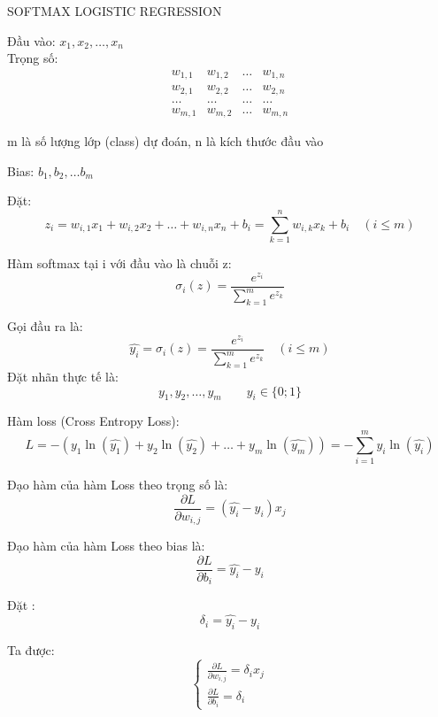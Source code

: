 \documentclass{article}
\begin{document}
\begin{center}
    {\LARGE SOFTMAX LOGISTIC REGRESSION}
\end{center}

\noindent Đầu vào: $x_1, x_2, \ldots, x_n$ \\
Trọng số: 
\[
    \begin{matrix}
        w_{1, 1} & w_{1, 2} & \ldots & w_{1, n} \\
        w_{2, 1} & w_{2, 2} & \ldots & w_{2, n} \\
        \ldots & \ldots & \ldots & \ldots \\
        w_{m, 1} & w_{m, 2} & \ldots & w_{m, n}
    \end{matrix}
\] 

\noindent m là số lượng lớp (class) dự đoán, n là kích thước đầu vào

\noindent Bias: $b_1, b_2, \ldots b_m$

\vspace{0.3cm}
\noindent Đặt: 
\[
z_i = w_{i, 1}x_1 + w_{i, 2}x_2 + \dots + w_{i, n}x_n + b_i = 
    \sum_{k = 1}^{n}w_{i, k}x_k + b_i
    \quad (i \leq m)
\] 

\noindent Hàm softmax tại i với đầu vào là chuỗi z:
\[
    \sigma_i(z) = \frac{e^{z_i}}{\sum_{k = 1}^{m}e^{z_k}}
\]

\vspace{0.3cm}
\noindent Gọi đầu ra là:
\[
    \hat{y_i} = \sigma_i(z) = \frac{e^{z_i}}{\sum_{k = 1}^{m}e^{z_k}} 
    \quad (i \leq m)
\]
Đặt nhãn thực tế là: \[y_1, y_2, \ldots, y_m \qquad y_i \in \{0; 1\}\]

\vspace{0.3cm}
\noindent Hàm loss (Cross Entropy Loss):
\[
    L = -\left(y_1\ln(\hat{y_1}) + y_2\ln(\hat{y_2}) + \ldots + y_m\ln(\hat{y_m})\right) = 
     -\sum_{i = 1}^{m}y_i\ln(\hat{y_i})
\]

\noindent Đạo hàm của hàm Loss theo trọng số là:
\[
    \frac{\partial L}{\partial w_{i, j}} = 
    (\hat{y_i} - y_i)x_j
\]

\noindent Đạo hàm của hàm Loss theo bias là:
\[
    \frac{\partial L}{\partial b_i} = 
    \hat{y_i} - y_i
\]

\noindent Đặt :
\[
    \delta_i = \hat{y_i} - y_i
\]

\noindent Ta được:
\[
    \begin{cases}
    \frac{\partial L}{\partial w_{i, j}} = 
    \delta_i x_j \\
    \frac{\partial L}{\partial b_i} = \delta_i
    \end{cases}
\]
\end{document}
